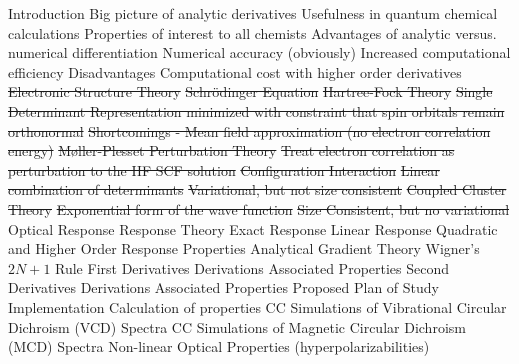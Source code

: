 
\begin{outline}[enumerate]
    \1 Introduction
        \2 Big picture of analytic derivatives
            \3 Usefulness in quantum chemical calculations
                \4 Properties of interest to all chemists
            \3 Advantages of analytic versus. numerical differentiation
                \4 Numerical accuracy (obviously)
                \4 Increased computational efficiency
            \3 Disadvantages
                \4 Computational cost with higher order derivatives
    \1 \sout{Electronic Structure Theory}
        \2 \sout{Schr\"{o}dinger Equation}
        \2 \sout{Hartree-Fock Theory}
            \3 \sout{Single Determinant Representation minimized with constraint that spin orbitals remain orthonormal}
            \3 \sout{Shortcomings - Mean field approximation (no electron correlation energy)}
        \2 \sout{M{\o}ller-Plesset Perturbation Theory}
            \3 \sout{Treat electron correlation as perturbation to the HF SCF solution}
        \2 \sout{Configuration Interaction}
            \3 \sout{Linear combination of determinants}
            \3 \sout{Variational, but not size consistent}
        \2 \sout{Coupled Cluster Theory}
            \3 \sout{Exponential form of the wave function}
            \3 \sout{Size Consistent, but no variational}
    \1 Optical Response
        \2 Response Theory
            \3 Exact Response
            \3 Linear Response
            \3 Quadratic and Higher Order Response
        \2 Properties
    \1 Analytical Gradient Theory
        \2 Wigner's $2N + 1$ Rule
        \2 First Derivatives
            \3 Derivations
            \3 Associated Properties
        \2 Second Derivatives
            \3 Derivations
            \3 Associated Properties
    \1 Proposed Plan of Study
        \2 Implementation
        \2 Calculation of properties
            \3 CC Simulations of Vibrational Circular Dichroism (VCD) Spectra
            \3 CC Simulations of Magnetic Circular Dichroism (MCD) Spectra
            \3 Non-linear Optical Properties (hyperpolarizabilities)
\end{outline}

